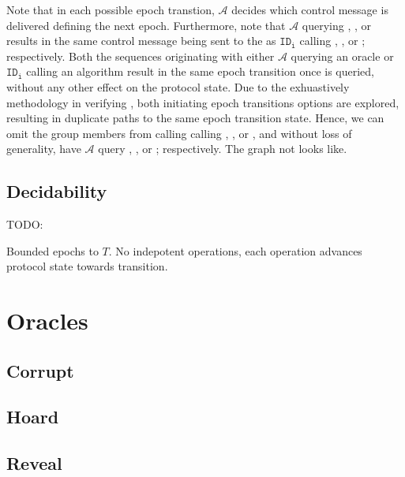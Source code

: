 Note that in each possible epoch transtion, \(\mathcal{A}\) decides which control message is delivered defining the next epoch.
Furthermore, note that \(\mathcal{A}\) querying , , or  results in the same control message being sent to the  as \(\mathtt{ID_i}\) calling , , or ; respectively.
Both the sequences originating with either \(\mathcal{A}\) querying an oracle or \(\mathtt{ID_i}\) calling an algorithm result in the same epoch transition once  is queried, without any other effect on the protocol state.
Due to the exhuastively methodology in verifying , both initiating epoch transitions options are explored, resulting in duplicate paths to the same epoch transition state.
Hence, we can omit the group members from calling calling , , or , and without loss of generality, have \(\mathcal{A}\) query , , or ; respectively.
The graph not looks like.


\hypertarget{decidability}{%
\subsection{Decidability}\label{decidability}}

TODO:

Bounded epochs to \(T\).
No indepotent operations, each operation advances protocol state towards transition.


\hypertarget{sec:game-oracles}{%
\section{Oracles}\label{sec:game-oracles}}


\hypertarget{corrupt}{%
\subsection{Corrupt}\label{corrupt}}


\hypertarget{hoard}{%
\subsection{Hoard}\label{hoard}}


\hypertarget{reveal}{%
\subsection{Reveal}\label{reveal}}


